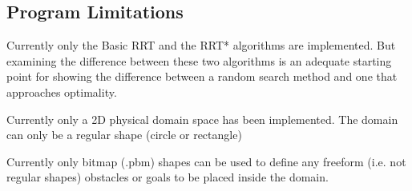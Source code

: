 \documentclass[10pt]{article}
\begin{document}
	\subsection{Program Limitations}
		Currently only the Basic RRT and the RRT* algorithms are implemented. But examining the difference between these two algorithms is an adequate starting point for showing the difference between a random search method and one that approaches optimality.
		
		Currently only a 2D physical domain space has been implemented. The domain can only be a regular shape (circle or rectangle)
		
		Currently only bitmap (.pbm) shapes can be used to define any freeform (i.e. not regular shapes) obstacles or goals to be placed inside the domain.

\newpage


\newpage


\newpage
	
\end{document}
